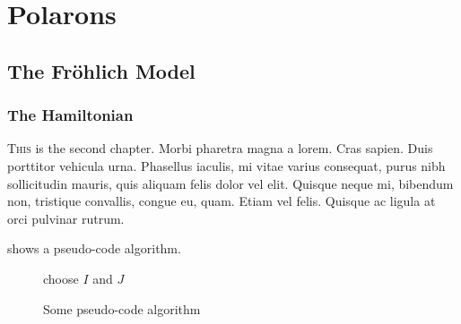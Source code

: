 \chapter{Polarons}
\label{chap:fourth}

\section{The Fr\"ohlich Model}
\label{sec:chap-fourth-first}

\subsection{The Hamiltonian}
\label{subsec:chap-fourth-first}

\lettrine{T}{his} is the second chapter.
Morbi pharetra magna a lorem.
Cras sapien.
Duis porttitor vehicula urna.
Phasellus iaculis, mi vitae varius consequat, purus nibh sollicitudin mauris, quis aliquam felis dolor vel elit.
Quisque neque mi, bibendum non, tristique convallis, congue eu, quam.
Etiam vel felis.
Quisque ac ligula at orci pulvinar rutrum.

 shows a pseudo-code algorithm.
\begin{figure}[!ht]
  \begin{algorithm}[H] %
  
    choose \(I\) and \(J\)\;
  \end{algorithm}
  \caption{Some pseudo-code algorithm}
  \label{fig:chap-second-algorithm}
\end{figure}
 